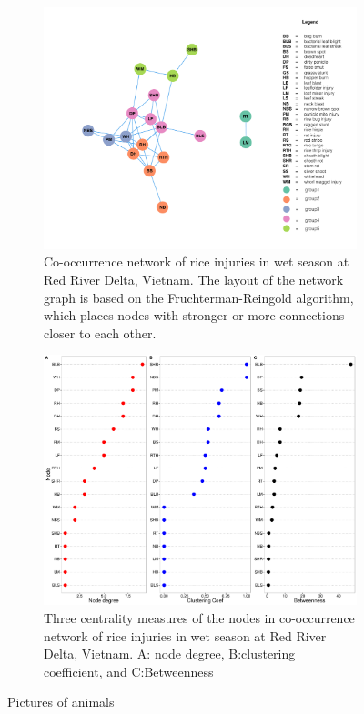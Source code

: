 \begin{figure}
    \centering
    \begin{subfigure}[b]{1\textwidth}
        \includegraphics[width = 1\textwidth]{figures/networkRR_ws/networkRR_ws.pdf}
        \caption{Co-occurrence network of rice injuries in wet season at Red River Delta, Vietnam. The layout of the network graph is based on the Fruchterman-Reingold algorithm, which places nodes with stronger or more connections closer to each other.}
        \label{fig:gull}
    \end{subfigure}
    \begin{subfigure}[b]{1\textwidth}
        \includegraphics[width = 1\textwidth]{figures/nodepropRR_ws/nodepropRR_ws.pdf}
        \caption{Three centrality measures of the nodes in co-occurrence network of rice injuries in wet season at Red River Delta, Vietnam. A: node degree, B:clustering coefficient, and C:Betweenness}
        \label{fig:nodepropCP_ds}
    \end{subfigure}
    \caption{Pictures of animals}
    \label{fig:animals}
\end{figure}


